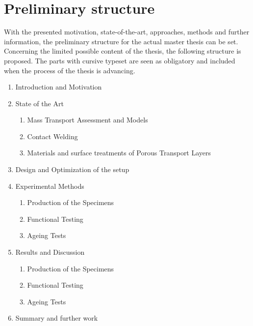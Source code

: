 \section{Preliminary structure}
With the presented motivation, state-of-the-art, approaches, methods and further information, the preliminary structure for the actual master thesis can be set. Concerning the limited possible content of the thesis, the following structure is proposed. The parts with cursive typeset are seen as obligatory and included when the process of the thesis is advancing.
\vspace{6pt}
        \begin{enumerate}\bfseries \singlespacing \small
            \renewcommand{\labelenumi}{\theenumi}
            \renewcommand{\theenumi}{\arabic{enumi}}
            \renewcommand{\labelenumii}{\theenumii}
            \renewcommand{\theenumii}{\theenumi.\arabic{enumii}}
            \setlength{\leftmarginii}{5.4ex}
            \item Introduction and Motivation
            \item State of the Art
            \begin{enumerate} \mdseries
                \item Mass Transport Assessment and Models
                \item Contact Welding
                \item Materials and surface treatments of Porous Transport Layers
            \end{enumerate}
            \item Design and Optimization of the setup
            \item Experimental Methods
            \begin{enumerate} \mdseries
                \item Production of the Specimens
                \item Functional Testing
                \item Ageing Tests
            \end{enumerate}
            \item Results and Discussion
            \begin{enumerate} \mdseries
                \item Production of the Specimens
                \item Functional Testing
                \item Ageing Tests
            \end{enumerate}
            \item Summary and further work
        \end{enumerate} %
